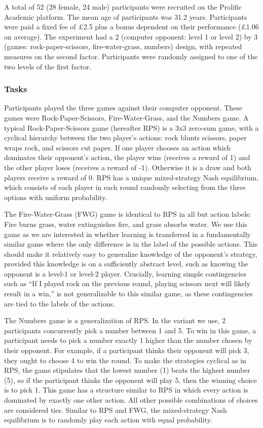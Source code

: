 \documentclass[
  english,
  man,floatsintext]{apa6}
\begin{document}
A total of 52 (28 female, 24 male) participants were recruited on the Prolific Academic platform. The mean age of participants was 31.2 years. Participants were paid a fixed fee of £2.5 plus a bonus dependent on their performance (£1.06 on average). The experiment had a 2 (computer opponent: level 1 or level 2) by 3 (games: rock-paper-scissors, fire-water-grass, numbers) design, with repeated measures on the second factor. Participants were randomly assigned to one of the two levels of the first factor.

\hypertarget{tasks}{%
\subsubsection{Tasks}\label{tasks}}

Participants played the three games against their computer opponent. These games were Rock-Paper-Scissors, Fire-Water-Grass, and the Numbers game. A typical Rock-Paper-Scissors game (hereafter RPS) is a 3x3 zero-sum game, with a cyclical hierarchy between the two player's actions: rock blunts scissors, paper wraps rock, and scissors cut paper. If one player chooses an action which dominates their opponent's action, the player wins (receives a reward of 1) and the other player loses (receives a reward of -1). Otherwise it is a draw and both players receive a reward of 0. RPS has a unique mixed-strategy Nash equilibrium, which consists of each player in each round randomly selecting from the three options with uniform probability.

The Fire-Water-Grass (FWG) game is identical to RPS in all but action labels: Fire burns grass, water extinguishes fire, and grass absorbs water. We use this game as we are interested in whether learning is transferred in a fundamentally similar game where the only difference is in the label of the possible actions. This should make it relatively easy to generalize knowledge of the opponent's strategy, provided this knowledge is on a sufficiently abstract level, such as knowing the opponent is a level-1 or level-2 player. Crucially, learning simple contingencies such as ``If I played rock on the previous round, playing scissors next will likely result in a win,'' is not generalizable to this similar game, as these contingencies are tied to the labels of the actions.

The Numbers game is a generalization of RPS. In the variant we use, 2 participants concurrently pick a number between 1 and 5. To win in this game, a participant needs to pick a number exactly 1 higher than the number chosen by their opponent. For example, if a participant thinks their opponent will pick 3, they ought to choose 4 to win the round. To make the strategies cyclical as in RPS, the game stipulates that the lowest number (1) beats the highest number (5), so if the participant thinks the opponent will play 5, then the winning choice is to pick 1. This game has a structure similar to RPS in which every action is dominated by exactly one other action. All other possible combinations of choices are considered ties. Similar to RPS and FWG, the mixed-strategy Nash equilibrium is to randomly play each action with equal probability.
\end{document}
